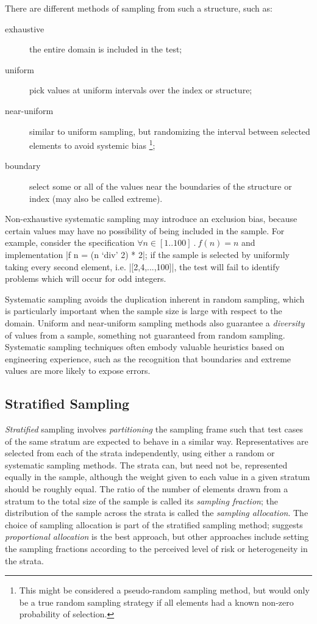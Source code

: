 There are different methods of sampling from such a structure, such as:

\begin{description}
\item[exhaustive] the entire domain is included in the test;
\item[uniform] pick values at uniform intervals over the index or structure;
\item[near-uniform] similar to uniform sampling, 
but randomizing the interval between selected elements to avoid systemic bias%
\footnote{This might be considered a pseudo-random sampling method,
but would only be a true random sampling strategy if 
all elements had a known non-zero probability of selection.};
\item[boundary] select some or all of 
the values near the boundaries of the structure or index
(may also be called extreme).
\end{description}

\noindent
Non-exhaustive systematic sampling may introduce an exclusion bias,
because certain values may have no possibility of being included in the sample.
For example, consider the specification $\forall n \in [1 .. 100]\ .\ f(n) = n$ 
and implementation |f n = (n `div' 2) * 2|;
if the sample is selected by uniformly taking every second element,
i.e. |[2,4,...,100]|, the test will fail to identify problems which will occur for odd integers.

Systematic sampling avoids the duplication inherent in random sampling,
which is particularly important when the sample size is large with respect to the domain.
Uniform and near-uniform sampling methods also guarantee a \emph{diversity}
of values from a sample, something not guaranteed from random sampling.
Systematic sampling techniques often embody valuable heuristics
based on engineering experience,
such as the recognition that boundaries and extreme values are 
more likely to expose errors.

\subsection{Stratified Sampling}

\emph{Stratified} sampling involves \emph{partitioning} the sampling frame such that 
test cases of the same stratum are expected to behave in a similar way.
Representatives are selected from each of the strata independently,
using either a random or systematic sampling methods.
The strata can, but need not be, represented equally in the sample,
although the weight given to each value in a given stratum should be roughly equal.
The ratio of the number of elements drawn from a stratum
to the total size of the sample is called its \emph{sampling fraction};
the distribution of the sample across the strata is called the \emph{sampling allocation}.
The choice of sampling allocation is part of the stratified sampling method;
\cite{Podgurski1999} suggests \emph{proportional allocation} is the best approach,
but other approaches include setting the sampling fractions
according to the perceived level of risk or heterogeneity in the strata.

